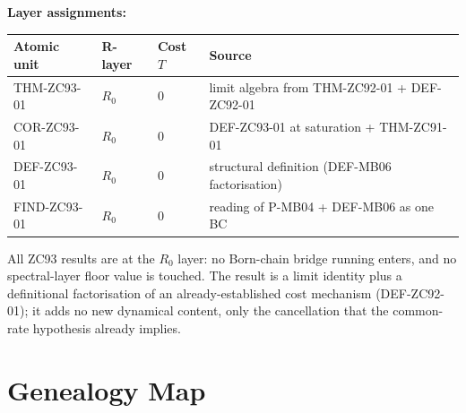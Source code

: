 \documentclass[12pt, a4paper]{article}
\begin{document}
\begin{layerbox}[title={R-Layer Assignments for ZC93}]

\textbf{Layer assignments:}

{\small\renewcommand{\arraystretch}{1.25}
\begin{center}
\begin{tabular}{@{}llll@{}}
\toprule
Atomic unit & R-layer & Cost $T$ & Source \\
\midrule
THM-ZC93-01  & $R_0$ & $0$ & limit algebra from THM-ZC92-01 + DEF-ZC92-01 \\
COR-ZC93-01  & $R_0$ & $0$ & DEF-ZC93-01 at saturation + THM-ZC91-01 \\
DEF-ZC93-01  & $R_0$ & $0$ & structural definition (DEF-MB06 factorisation) \\
FIND-ZC93-01 & $R_0$ & $0$ & reading of P-MB04 + DEF-MB06 as one BC \\
\bottomrule
\end{tabular}
\end{center}}

All ZC93 results are at the $R_0$ layer: no Born-chain bridge running enters,
and no spectral-layer floor value is touched. The result is a limit identity
plus a definitional factorisation of an already-established cost mechanism
(DEF-ZC92-01); it adds no new dynamical content, only the cancellation that
the common-rate hypothesis already implies.
\end{layerbox}

\section{Genealogy Map}
\label{sec:genealogy-zc93}
\end{document}
